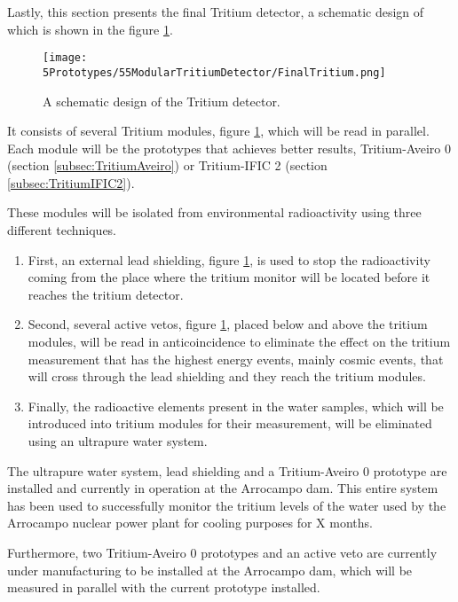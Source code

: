 Lastly, this section presents the final Tritium detector, a schematic design of which is shown in the figure \ref{fig:TritiumDetectorSchematicDesign}.

\begin{figure}[h]
\centering
\texttt{[image: 5Prototypes/55ModularTritiumDetector/FinalTritium.png]}
\caption{A schematic design of the Tritium detector.\label{fig:TritiumDetectorSchematicDesign}}
\end{figure}

It consists of several Tritium modules, figure \ref{fig:TritiumDetectorSchematicDesign}, which will be read in parallel. Each module will be the prototypes that achieves better results, Tritium-Aveiro 0 (section \ref{subsec:TritiumAveiro}) or Tritium-IFIC 2 (section \ref{subsec:TritiumIFIC2}).

These modules will be isolated from environmental radioactivity using three different techniques.

\begin{enumerate}

\item{} First, an external lead shielding, figure \ref{fig:TritiumDetectorSchematicDesign}, is used to stop the radioactivity coming from the place where the tritium monitor will be located before it reaches the tritium detector.

\item{} Second, several active vetos, figure \ref{fig:TritiumDetectorSchematicDesign}, placed below and above the tritium modules, will be read in anticoincidence to eliminate the effect on the tritium measurement that has the highest energy events, mainly cosmic events, that will cross through the lead shielding and they reach the tritium modules.

\item{} Finally, the radioactive elements present in the water samples, which will be introduced into tritium modules for their measurement, will be eliminated using an ultrapure water system.

\end{enumerate}

The ultrapure water system, lead shielding and a Tritium-Aveiro 0 prototype are installed and currently in operation at the Arrocampo dam. This entire system has been used to successfully monitor the tritium levels of the water used by the Arrocampo nuclear power plant for cooling purposes for X months.

Furthermore, two Tritium-Aveiro 0 prototypes and an active veto are currently under manufacturing to be installed at the Arrocampo dam, which will be measured in parallel with the current prototype installed.

